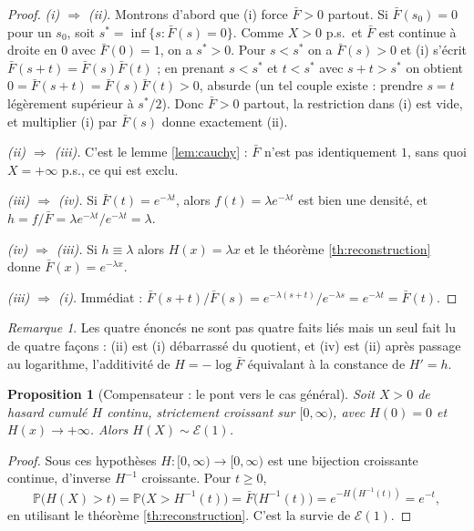 \documentclass[11pt,a4paper]{article}
\theoremstyle{plain}
\newtheorem{proposition}[theoreme]{Proposition}
\theoremstyle{definition}
\theoremstyle{remark}
\newtheorem{remarque}[theoreme]{Remarque}
\newcommand{\Prob}{\mathbb{P}}
\newcommand{\Expo}{\mathcal{E}}
\newcommand{\barF}{\bar{F}}
\begin{document}
\begin{proof}
\emph{(i) $\Rightarrow$ (ii).} Montrons d'abord que (i) force $\barF>0$ partout.
Si $\barF(s_0)=0$ pour un $s_0$, soit $s^\ast=\inf\{s:\barF(s)=0\}$. Comme $X>0$
p.s.\ et $\barF$ est continue à droite en $0$ avec $\barF(0)=1$, on a
$s^\ast>0$. Pour $s<s^\ast$ on a $\barF(s)>0$ et (i) s'écrit
$\barF(s+t)=\barF(s)\barF(t)$ ; en prenant $s<s^\ast$ et $t<s^\ast$ avec
$s+t>s^\ast$ on obtient $0=\barF(s+t)=\barF(s)\barF(t)>0$, absurde (un tel
couple existe : prendre $s=t$ légèrement supérieur à $s^\ast/2$). Donc
$\barF>0$ partout, la restriction dans (i) est vide, et multiplier (i) par
$\barF(s)$ donne exactement (ii).

\emph{(ii) $\Rightarrow$ (iii).} C'est le lemme \ref{lem:cauchy} : $\barF$ n'est
pas identiquement $1$, sans quoi $X=+\infty$ p.s., ce qui est exclu.

\emph{(iii) $\Rightarrow$ (iv).} Si $\barF(t)=e^{-\lambda t}$, alors
$f(t)=\lambda e^{-\lambda t}$ est bien une densité, et
$h=f/\barF=\lambda e^{-\lambda t}/e^{-\lambda t}=\lambda$.

\emph{(iv) $\Rightarrow$ (iii).} Si $h\equiv\lambda$ alors $H(x)=\lambda x$ et le
théorème \ref{th:reconstruction} donne $\barF(x)=e^{-\lambda x}$.

\emph{(iii) $\Rightarrow$ (i).} Immédiat :
$\barF(s+t)/\barF(s)=e^{-\lambda(s+t)}/e^{-\lambda s}=e^{-\lambda t}=\barF(t)$.
\end{proof}

\begin{remarque}
Les quatre énoncés ne sont pas quatre faits liés mais un seul fait lu de quatre
façons : (ii) est (i) débarrassé du quotient, et (iv) est (ii) après passage au
logarithme, l'additivité de $H=-\log\barF$ équivalant à la constance de $H'=h$.
\end{remarque}

\begin{proposition}[Compensateur : le pont vers le cas général]\label{prop:compensateur}
Soit $X>0$ de hasard cumulé $H$ continu, strictement croissant sur $[0,\infty)$,
avec $H(0)=0$ et $H(x)\to+\infty$. Alors $H(X)\sim\Expo(1)$.
\end{proposition}

\begin{proof}
Sous ces hypothèses $H:[0,\infty)\to[0,\infty)$ est une bijection croissante
continue, d'inverse $H^{-1}$ croissante. Pour $t\ge0$,
\[
\Prob\bigl(H(X)>t\bigr)=\Prob\bigl(X>H^{-1}(t)\bigr)=\barF\bigl(H^{-1}(t)\bigr)
=e^{-H(H^{-1}(t))}=e^{-t},
\]
en utilisant le théorème \ref{th:reconstruction}. C'est la survie de $\Expo(1)$.
\end{proof}
\end{document}
